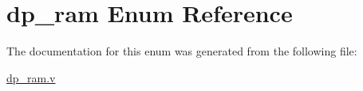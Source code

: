 \hypertarget{enumdp__ram}{}\section{dp\+\_\+ram Enum Reference}
\label{enumdp__ram}


The documentation for this enum was generated from the following file\+:\begin{DoxyCompactItemize}
\item 
\mbox{\hyperlink{dp__ram_8v}{dp\+\_\+ram.\+v}}\end{DoxyCompactItemize}
